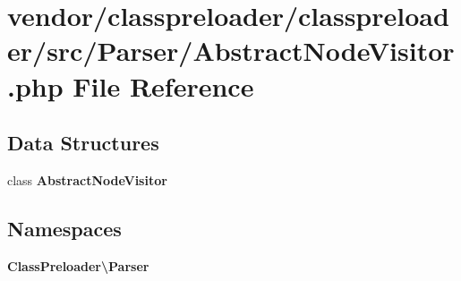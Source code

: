 \section{vendor/classpreloader/classpreloader/src/\+Parser/\+Abstract\+Node\+Visitor.php File Reference}
\label{_abstract_node_visitor_8php}
\subsection*{Data Structures}
\begin{DoxyCompactItemize}
\item 
class {\bf Abstract\+Node\+Visitor}
\end{DoxyCompactItemize}
\subsection*{Namespaces}
\begin{DoxyCompactItemize}
\item 
 {\bf Class\+Preloader\textbackslash{}\+Parser}
\end{DoxyCompactItemize}
